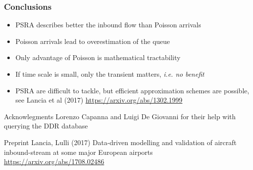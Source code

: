 \documentclass[table,aspectratio=169]{beamer}
\begin{document}
\begin{frame}[t]\frametitle{Conclusions}
    \begin{itemize}
        \item PSRA describes better the inbound flow than Poisson arrivals
        \item Poisson arrivals lead to \alert{overestimation of the queue}
        \item Only advantage of Poisson is mathematical tractability
        \item If time scale is small, \alert{only the transient matters, \emph{i.e. no benefit}}
        \item PSRA are difficult to tackle, but efficient approximation schemes are possible, see Lancia et al (2017) \url{https://arxiv.org/abs/1302.1999}
    \end{itemize}

    \begin{alertblock}{Acknowlegments}
        Lorenzo Capanna and Luigi De Giovanni for their help with querying the DDR database
    \end{alertblock}

    \begin{alertblock}{Preprint}
        Lancia, Lulli (2017) Data-driven modelling and validation of aircraft inbound-stream at some major European airports \url{https://arxiv.org/abs/1708.02486}
    \end{alertblock}
\end{frame}
\end{document}
